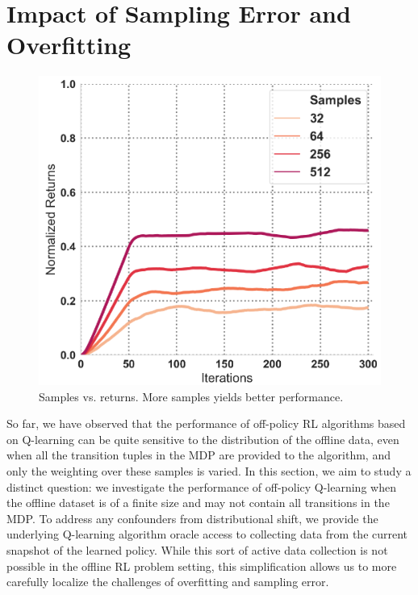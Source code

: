 \vspace{-0.2cm}
\section{Impact of Sampling Error and Overfitting}
\label{sec:overfitting}
\vspace{-0.2cm}

\begin{figure}
    \centering
    \vspace{-20pt}
    \includegraphics[width=0.8\linewidth]{chapters/diagnosing_q/images/samples_arch.pdf}
    \vspace{-0.2cm}
    \caption{\label{fig:sampling_256} Samples vs. returns. More samples yields better performance.}
    \vspace{-0.6cm}
\end{figure}
So far, we have observed that the performance of off-policy RL algorithms based on Q-learning can be quite sensitive to the distribution of the offline data, even when all the transition tuples in the MDP are provided to the algorithm, and only the weighting over these samples is varied. In this section, we aim to study a distinct question: we investigate the performance of off-policy Q-learning when the offline dataset is of a finite size and may not contain all transitions in the MDP. To address any confounders from distributional shift, we provide the underlying Q-learning algorithm oracle access to collecting data from the current snapshot of the learned policy. While this sort of active data collection is not possible in the offline RL problem setting, this simplification allows us to more carefully localize the challenges of overfitting and sampling error.

